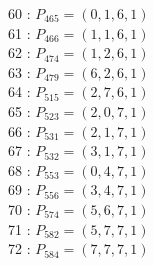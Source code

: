 \documentclass{article}
\begin{document}
{\begin{multicols}{3}
60 : $P_{465}=( 0, 1, 6, 1 )$\\
61 : $P_{466}=( 1, 1, 6, 1 )$\\
62 : $P_{474}=( 1, 2, 6, 1 )$\\
63 : $P_{479}=( 6, 2, 6, 1 )$\\
64 : $P_{515}=( 2, 7, 6, 1 )$\\
65 : $P_{523}=( 2, 0, 7, 1 )$\\
66 : $P_{531}=( 2, 1, 7, 1 )$\\
67 : $P_{532}=( 3, 1, 7, 1 )$\\
68 : $P_{553}=( 0, 4, 7, 1 )$\\
69 : $P_{556}=( 3, 4, 7, 1 )$\\
70 : $P_{574}=( 5, 6, 7, 1 )$\\
71 : $P_{582}=( 5, 7, 7, 1 )$\\
72 : $P_{584}=( 7, 7, 7, 1 )$\\
\end{multicols}


%


%


}%
\end{document}
